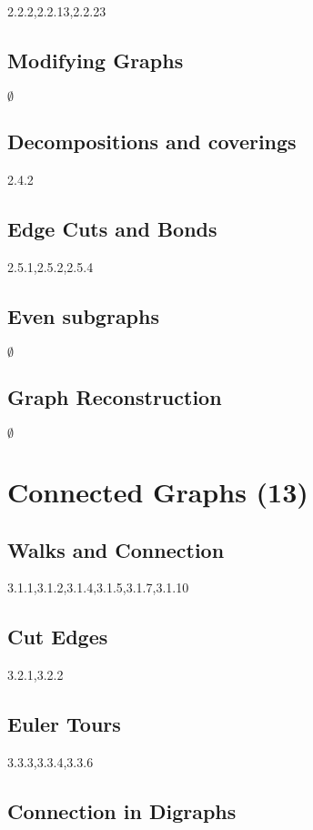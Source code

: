 \documentclass[12pt]{article}
\begin{document}
2.2.2,2.2.13,2.2.23

\subsection{Modifying Graphs}
$\emptyset$

\subsection{Decompositions and coverings}

2.4.2

\subsection{Edge Cuts and Bonds}

2.5.1,2.5.2,2.5.4

\subsection{Even subgraphs}

$\emptyset$

\subsection{Graph Reconstruction}

$\emptyset$

\newpage

\section{Connected Graphs (13)}

\subsection{Walks and Connection}

3.1.1,3.1.2,3.1.4,3.1.5,3.1.7,3.1.10

\subsection{Cut Edges}

3.2.1,3.2.2

\subsection{Euler Tours}
3.3.3,3.3.4,3.3.6

\subsection{Connection in Digraphs}
\end{document}
